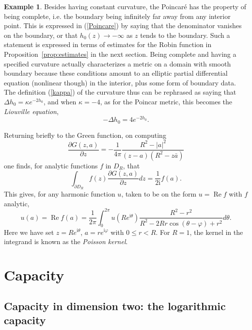 \documentclass[reqno,12pt]{article}
\theoremstyle{plain}
\theoremstyle{definition}
\newtheorem{example}[defn]{Example}
\numberwithin{equation}{section}
\numberwithin{figure}{section}
\DeclareMathOperator{\re}{Re}
\def\I{\mathrm{i}}
\begin{document}
\begin{example}
Besides having constant curvature, the Poincar\'{e} has the property of being complete, i.e.
the boundary being infinitely far away from any interior point. This is expressed in (\ref{Poincare})
by saying that the denominator vanishes on the boundary, or that $h_0(z)\to -\infty$ as $z$ tends to the boundary. 
Such a statement is expressed in terms of estimates for the Robin function in Proposition~\ref{prop:estimates}
in the next section. Being complete and having a specified curvature actually characterizes a metric
on a domain with smooth boundary because these conditions amount to an elliptic 
partial differential equation (nonlinear though) in the interior, plus some form of boundary data.
The definition (\ref{kappa}) of the curvature thus can be rephrased as saying that $\Delta h_0=\kappa e^{-2h_0}$,
and when $\kappa= -4$, as for the Poincar metric, this becomes the {\it Liouville equation},
\begin{equation}\label{Liouville}
-\Delta h_0=4e^{-2h_0}.
\end{equation}

Returning briefly to the Green function, on computing
$$
\frac{\partial G(z,a)}{\partial z}=-\frac{1}{4\pi}\frac{R^2-|a|^2}{(z-a)(R^2-z\bar{a})}
$$
one finds, for analytic functions $f$ in $D_R$, that
$$
\int_{\partial D_R} f(z)\frac{\partial G(z,a)}{\partial z}dz =\frac{1}{2\I}f(a).
$$
This gives, for any harmonic function $u$, taken to be on the form $u=\re f$ with $f$ analytic,
\begin{equation}\label{Poisson}
u(a)=\re f(a)
=\frac{1}{2\pi}\int_0^{2\pi} u(Re^{\I\theta})\frac{R^2-r^2}{R^2-2Rr\cos({\theta-\varphi})+r^2}d\theta.
\end{equation}
Here we have set $z=Re^{\I\theta}$, $a=re^{\I\varphi}$ with $0\leq r<R$.
For $R=1$, the kernel in the integrand is known as the {\it Poisson kernel}.
\end{example}


\section{Capacity}\label{sec:capacity}

\subsection{Capacity in dimension two: the logarithmic capacity}\label{sec:logarithmic capacity}
\end{document}
